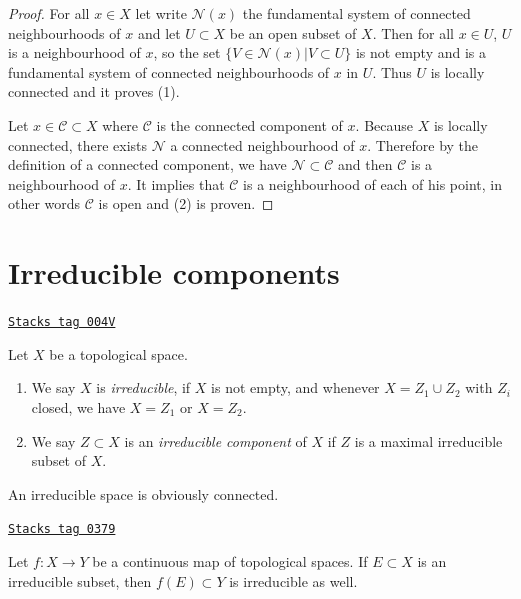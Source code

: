 \begin{proof}
For all $x\in X$ let write $\mathcal{N}(x)$ the fundamental system of connected
neighbourhoods of $x$ and let $U\subset X$ be an open subset of $X$. Then for
all $x\in U$, $U$ is a neighbourhood of $x$, so the set
$\{V \in \mathcal{N}(x) | V\subset U\}$
is not empty and is a fundamental system of connected
neighbourhoods of $x$ in $U$. Thus $U$ is locally connected and it proves (1).

\medskip\noindent
Let $x \in \mathcal{C} \subset X$ where $\mathcal{C}$ is the connected component
of $x$. Because $X$ is locally connected, there exists $\mathcal{N}$ a
connected neighbourhood of $x$. Therefore by the definition of a connected
component, we have $\mathcal{N} \subset \mathcal{C}$ and then $\mathcal{C}$ is
a neighbourhood of $x$. It implies that $\mathcal{C}$ is a neighbourhood of
each of his point, in other words $\mathcal{C}$ is open and (2) is proven.
\end{proof}

\section{Irreducible components}
\label{topology-section-irreducible-components}
\begin{definition}
\label{topology-definition-irreducible-components}
\href{https://stacks.math.columbia.edu/tag/004V}{\texttt{Stacks tag 004V}}

Let $X$ be a topological space.
\begin{enumerate}
\item We say $X$ is {\it irreducible}, if $X$ is not empty, and whenever
$X = Z_1 \cup Z_2$ with $Z_i$ closed, we have $X = Z_1$ or $X = Z_2$.
\item We say $Z \subset X$ is an {\it irreducible component} of $X$
if $Z$ is a maximal irreducible subset of $X$.
\end{enumerate}
\end{definition}

An irreducible space is obviously connected.

\begin{lemma}
\label{topology-lemma-image-irreducible-space}
\href{https://stacks.math.columbia.edu/tag/0379}{\texttt{Stacks tag 0379}}

Let $f : X \to Y$ be a continuous map of topological spaces.
If $E \subset X$ is an irreducible subset, then $f(E) \subset Y$
is irreducible as well.
\end{lemma}

